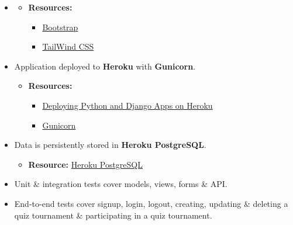 \documentclass{article}
\begin{document}
\begin{itemize}
	\item 
	\begin{itemize}
		\item \textbf{Resources:}
		\begin{itemize}
			\item \href{https://getbootstrap.com}{Bootstrap}
			\item \href{https://tailwindcss.com}{TailWind CSS}
		\end{itemize}
	\end{itemize}
	\item Application deployed to \textbf{Heroku} with \textbf{Gunicorn}.
	\begin{itemize}
		\item \textbf{Resources:} 
		\begin{itemize}
			\item \href{https://devcenter.heroku.com/articles/deploying-python}{Deploying Python and Django Apps on Heroku}
			\item \href{https://gunicorn.org/}{Gunicorn}
		\end{itemize}
	\end{itemize}
	\item Data is persistently stored in \textbf{Heroku PostgreSQL}.
	\begin{itemize}
		\item \textbf{Resource:} \href{https://www.heroku.com/postgres}{Heroku PostgreSQL}
	\end{itemize}
	\item Unit \& integration tests cover models, views, forms \& API.
	\item End-to-end tests cover signup, login, logout, creating, updating \& deleting a quiz tournament \& participating in a quiz tournament.
\end{itemize}
\end{document}
